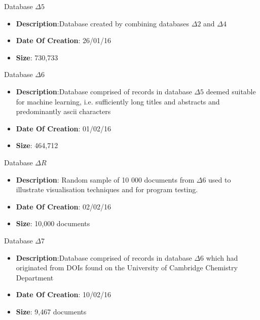 \begin{Large}\begin{textbf}{Database $\Delta 5$} \end{textbf}\end{Large}
	\begin{itemize}
	\item \textbf{Description}:Database created by combining databases $\Delta2$ and $\Delta4$
	\item \textbf{Date Of Creation}: 26/01/16
	\item \textbf{Size}: 730,733
	\end{itemize}
\begin{Large}\begin{textbf}{Database $\Delta 6$} \end{textbf}\end{Large}
	\begin{itemize}
	\item \textbf{Description}:Database comprised of records in database $\Delta5$ deemed suitable for machine learning, i.e.  sufficiently long titles and abstracts and predominantly ascii characters
	\item \textbf{Date Of Creation}: 01/02/16
	\item \textbf{Size}: 464,712
	\end{itemize}
\begin{Large}\begin{textbf}{Database $\Delta R$} \end{textbf}\end{Large}
	\begin{itemize}
	\item \textbf{Description}: Random sample of 10 000 documents from $\Delta 6$ used to illustrate visualisation techniques and for program testing.
	\item \textbf{Date Of Creation}: 02/02/16
	\item \textbf{Size}: 10,000 documents
	\end{itemize}
\begin{Large}\begin{textbf}{Database $\Delta 7$} \end{textbf}\end{Large}
	\begin{itemize}
	\item \textbf{Description}:Database comprised of records in database $\Delta6$ which had originated from DOIs found on the University of Cambridge Chemistry Department
	\item \textbf{Date Of Creation}: 10/02/16
	\item \textbf{Size}: 9,467 documents
	\end{itemize}
